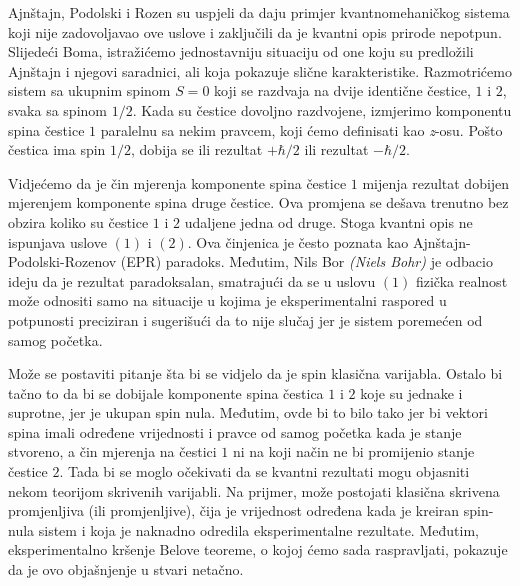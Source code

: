 Ajnštajn, Podolski i Rozen su uspjeli da daju primjer kvantnomehaničkog sistema koji
nije zadovoljavao ove uslove i zaključili da je kvantni opis prirode nepotpun.
Slijedeći Boma, istražićemo jednostavniju situaciju od one koju su predložili Ajnštajn
i njegovi saradnici, ali koja pokazuje slične karakteristike. Razmotri\' cemo sistem sa
ukupnim spinom $S = 0$ koji se razdvaja na dvije identične čestice, $1$ i $2$, svaka sa
spinom $1/2$. Kada su čestice dovoljno razdvojene, izmjerimo komponentu spina čestice $1$
paralelnu sa nekim pravcem, koji ćemo definisati kao {\it{z}}-osu. Pošto čestica ima spin
$1/2$, dobija se ili rezultat $+\hbar/2$ ili rezultat $-\hbar/2$.

Vidje\' cemo da je čin mjerenja komponente spina čestice $1$ mijenja
rezultat dobijen mjerenjem komponente spina druge čestice. Ova promjena se dešava
trenutno bez obzira koliko su čestice $1$ i $2$ udaljene jedna od druge. Stoga kvantni
opis ne ispunjava uslove $(1)$ i $(2)$. Ova činjenica je često poznata kao
Ajnštajn-Podolski-Rozenov (EPR) paradoks. Međutim, Nils Bor {\it{(Niels Bohr)}} je odbacio
ideju da je rezultat paradoksalan, smatrajući da se u uslovu $(1)$ fizička realnost
može odnositi samo na situacije u kojima je eksperimentalni raspored u potpunosti
preciziran i sugerišući da to nije slučaj jer je sistem poremećen od samog početka.

Može se postaviti pitanje šta bi se vidjelo da je spin klasična
varijabla. Ostalo bi tačno to da bi se dobijale komponente spina čestica $1$ i $2$ koje
su jednake i suprotne, jer je ukupan spin nula. Međutim, ovde bi to bilo tako jer bi
vektori spina imali određene vrijednosti i pravce od samog početka kada je stanje stvoreno, a čin mjerenja na čestici $1$ ni na koji način ne bi promijenio stanje čestice
$2$. Tada bi se moglo očekivati da se kvantni rezultati mogu objasniti nekom teorijom skrivenih varijabli. Na prijmer, može postojati klasična skrivena promjenljiva (ili
promjenljive), čija je vrijednost određena kada je kreiran spin-nula sistem i koja je
naknadno odredila eksperimentalne rezultate. Međutim, eksperimentalno kršenje Belove
teoreme, o kojoj ćemo sada raspravljati, pokazuje da je ovo objašnjenje u stvari
netačno.